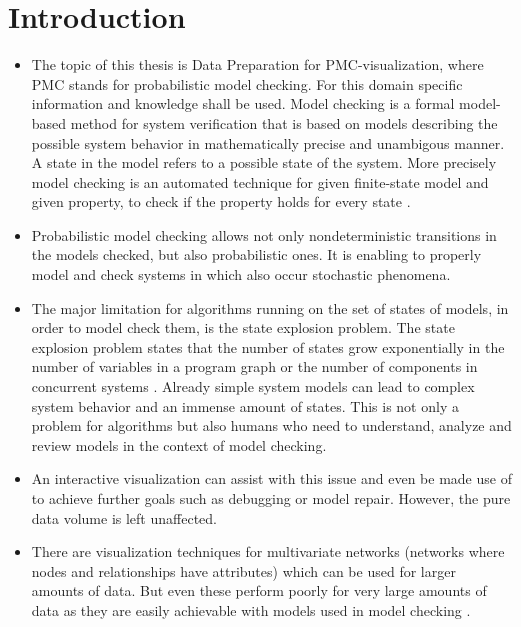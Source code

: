 \documentclass[preview]{standalone}
\begin{document}
\section{Introduction}

\begin{itemize}
	\item The topic of this thesis is Data Preparation for PMC-visualization, where PMC stands for probabilistic model checking. For this domain specific information and knowledge shall be used.
	Model checking is a formal model-based method for system verification that is based on models describing the possible system behavior in mathematically precise and unambigous manner. A state in the model refers to a possible state of the system. More precisely model checking is an automated technique for given finite-state model and given property, to check if the property holds for every state \cite[chs. 1.1 and 1.2]{Baier2008}.
	\item Probabilistic model checking allows not only nondeterministic transitions in the models checked, but also probabilistic ones. It is enabling to properly model and check systems in which also occur stochastic phenomena. 
	\item The major limitation for algorithms running on the set of states of models, in order to model check them, is the state explosion problem. The state explosion problem states that the number of states grow exponentially in the number of variables in a program graph or the number of components in concurrent systems \cite[ch. 2.3]{Baier2008}. Already simple system models can lead to complex system behavior and an immense amount of states. This is not only a problem for algorithms but also humans who need to understand, analyze and review models in the context of model checking.
	\item An interactive visualization can assist with this issue and even be made use of to achieve further goals such as debugging or model repair. However, the pure data volume is left unaffected.
	\item There are visualization techniques for multivariate networks (networks where nodes and relationships have attributes) which can be used for larger amounts of data. But even these perform poorly for very large amounts of data as they are easily achievable with models used in model checking \cite{Kerren2014,Nobre2019}. 
	

\end{itemize}
\end{document}
